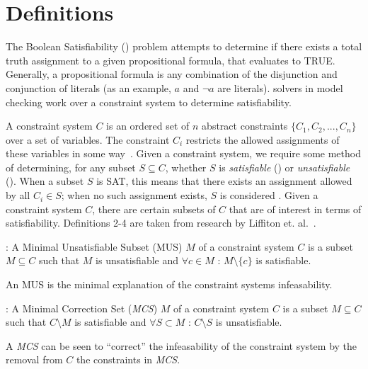 \section{Definitions}
\label{sec:definitions}
The Boolean Satisfiability (\sat) problem attempts to determine if there exists a total truth assignment to a given propositional formula, that evaluates to TRUE. Generally, a propositional formula is any combination of the disjunction and conjunction of literals (as an example, $a$ and $\neg a$ are literals). \sat solvers in model checking work over a constraint system to determine satisfiability.

A constraint system $C$ is an ordered set of $n$ abstract constraints $\{C_1, C_2, ..., C_n\}$ over a set of variables. The constraint $C_i$ restricts the allowed assignments of these variables in some way~\cite{liffiton2016fast}. Given a constraint system, we require some method of determining, for any subset $S \subseteq C$, whether $S$ is \textit{satisfiable} (\sat) or \textit{unsatisfiable} (\unsat). When a subset $S$ is SAT, this means that there exists an assignment allowed by all $C_i \in S$; when no such assignment exists, $S$ is considered \unsat. Given a constraint system $C$, there are certain subsets of $C$ that are of interest in terms of satisfiability. Definitions 2-4 are taken from research by Liffiton et. al.~\cite{liffiton2016fast}. 

\begin{definition} : A Minimal Unsatisfiable Subset (MUS) $M$ of a constraint system $C$ is a subset $M \subseteq C$ such that $M$ is unsatisfiable and $\forall c \in M$ : $M \setminus \{c\}$ is satisfiable. 
\end{definition}
\noindent
An MUS is the minimal explanation of the constraint systems infeasability. 
\begin{definition} : A Minimal Correction Set (\textit{MCS}) $M$ of a constraint system $C$ is a subset $M\subseteq C$ such that $C \setminus M$ is satisfiable and $\forall S \subset M$ : $C \setminus S$ is unsatisfiable. 
\end{definition}
\noindent
A \textit{MCS} can be seen to ``correct'' the infeasability of the constraint system by the removal from $C$ the constraints in \textit{MCS}.

